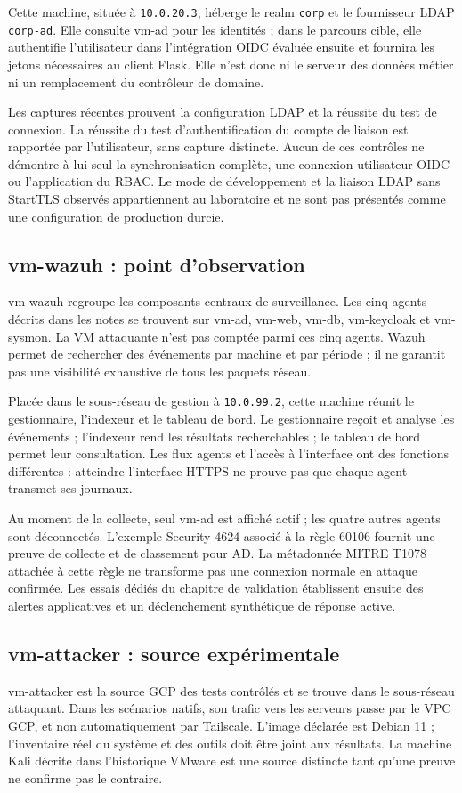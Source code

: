 \documentclass[a4paper,12pt]{report}
\begin{document}
Cette machine, située à \texttt{10.0.20.3}, héberge le realm \texttt{corp} et le fournisseur LDAP \texttt{corp-ad}. Elle consulte vm-ad pour les identités ; dans le parcours cible, elle authentifie l'utilisateur dans l'intégration OIDC évaluée ensuite et fournira les jetons nécessaires au client Flask. Elle n'est donc ni le serveur des données métier ni un remplacement du contrôleur de domaine.

Les captures récentes prouvent la configuration LDAP et la réussite du test de connexion. La réussite du test d'authentification du compte de liaison est rapportée par l'utilisateur, sans capture distincte. Aucun de ces contrôles ne démontre à lui seul la synchronisation complète, une connexion utilisateur OIDC ou l'application du RBAC. Le mode de développement et la liaison LDAP sans StartTLS observés appartiennent au laboratoire et ne sont pas présentés comme une configuration de production durcie.

\subsection{vm-wazuh : point d'observation}
vm-wazuh regroupe les composants centraux de surveillance. Les cinq agents décrits dans les notes se trouvent sur vm-ad, vm-web, vm-db, vm-keycloak et vm-sysmon. La VM attaquante n'est pas comptée parmi ces cinq agents. Wazuh permet de rechercher des événements par machine et par période ; il ne garantit pas une visibilité exhaustive de tous les paquets réseau.

Placée dans le sous-réseau de gestion à \texttt{10.0.99.2}, cette machine réunit le gestionnaire, l'indexeur et le tableau de bord. Le gestionnaire reçoit et analyse les événements ; l'indexeur rend les résultats recherchables ; le tableau de bord permet leur consultation. Les flux agents et l'accès à l'interface ont des fonctions différentes : atteindre l'interface HTTPS ne prouve pas que chaque agent transmet ses journaux.

Au moment de la collecte, seul vm-ad est affiché actif ; les quatre autres agents sont déconnectés. L'exemple Security 4624 associé à la règle 60106 fournit une preuve de collecte et de classement pour AD. La métadonnée MITRE T1078 attachée à cette règle ne transforme pas une connexion normale en attaque confirmée. Les essais dédiés du chapitre de validation établissent ensuite des alertes applicatives et un déclenchement synthétique de réponse active.

\subsection{vm-attacker : source expérimentale}
vm-attacker est la source GCP des tests contrôlés et se trouve dans le sous-réseau attaquant. Dans les scénarios natifs, son trafic vers les serveurs passe par le VPC GCP, et non automatiquement par Tailscale. L'image déclarée est Debian 11 ; l'inventaire réel du système et des outils doit être joint aux résultats. La machine Kali décrite dans l'historique VMware est une source distincte tant qu'une preuve ne confirme pas le contraire.
\end{document}
